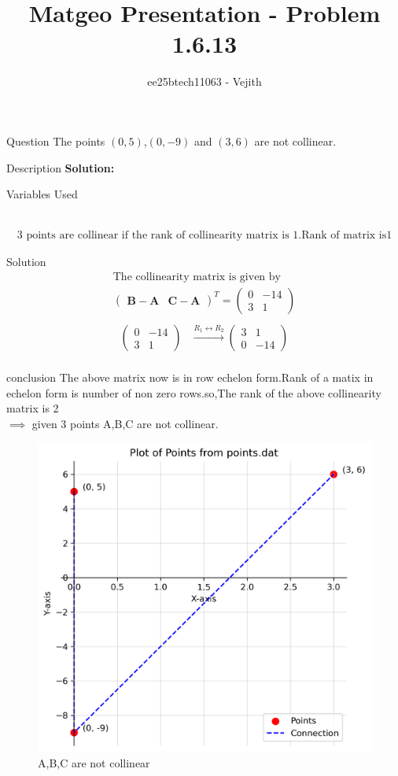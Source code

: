 \documentclass{beamer}
\title{Matgeo Presentation - Problem 1.6.13}
\author{ee25btech11063 - Vejith}
\numberwithin{equation}{section}
\providecommand{\brak}[1]{\ensuremath{\left(#1\right)}}
\theoremstyle{remark}
\newcommand{\myvec}[1]{\ensuremath{\begin{pmatrix}#1\end{pmatrix}}}
\let\vec\mathbf
\begin{document}
\frame{\titlepage}
\begin{frame}{Question}
The points $\brak{0,5}$,$\brak{0,-9}$ and $\brak{3,6}$ are  not collinear.
\end{frame}

\begin{frame}{Description}
\textbf{Solution: }\\
\begin{table}[h!]    
  \centering
  
  \caption{Variables Used}
  \label{}
\end{table}\\
\begin{align}
\text{3 points are collinear if the rank of collinearity matrix is 1.Rank of matrix is1}
\end{align}
\end{frame}

\begin{frame}{Solution}
\begin{align}
\text{The collinearity matrix is given by}\\
\myvec{
   \vec{B}-\vec{A} & \vec{C}-\vec{A}
 }^T = \myvec{
   0 & -14 
   \\
   3 & 1
   }\\
\end{align}
\begin{align}
    \myvec{
   0 & -14 
   \\
   3 & 1
   }
  &\xrightarrow{R_1 \leftrightarrow R_2}
   \myvec{
   3 & 1
   \\
   0 & -14
   }\\
 \end{align}
\end{frame}

\begin{frame}{conclusion}
 The above matrix now is in row echelon form.Rank of a matix in echelon form is number of non zero rows.so,The rank of the above collinearity matrix is 2\\
 $\implies$ given 3 points A,B,C are not collinear.
 \begin{figure}[h!]
   \centering
   \includegraphics[width=0.5\linewidth]{figs/01.png}
   \caption{A,B,C are not collinear}
   \label{}
\end{figure}
\end{frame}
\end{document}
